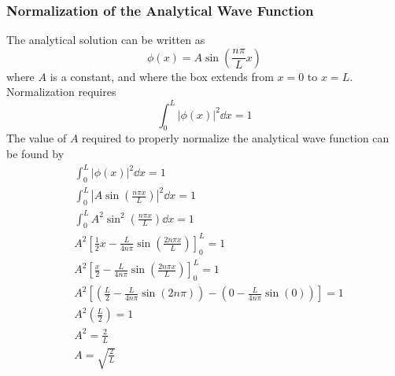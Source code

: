 \documentclass[a4paper, 10pt]{article}
\begin{document}
\subsubsection{Normalization of the Analytical Wave Function}
\noindent The analytical solution can be written as
\begin{equation}
    \phi(x) = A \sin \left( \frac{n \pi}{L} x \right)
\end{equation}
where $A$ is a constant, and where the box extends from $x = 0$ to $x = L$. Normalization requires
\begin{equation} \label{eq:1b_analytical_sol}
    \int_{0}^{L} |\phi(x)|^2 \dd{x} = 1
\end{equation}
The value of $A$ required to properly normalize the analytical wave function can be found by
\begin{align*}
    &\int^L_0 |\phi(x)|^2\dd{x} = 1 \\
    &\int^{L}_{0} \left| A \sin \left( \frac{n \pi x}{L} \right) \right|^2 \dd{x} = 1 \\
    &\int^{L}_{0} A^2 \sin^2 \left( \frac{n \pi x}{L} \right) \dd{x} = 1 \\
    &A^2 \left[ \frac{1}{2}x - \frac{L}{4 n \pi}\sin \left( \frac{2n \pi x}{L} \right) \right]^L_0 = 1 \\
    &A^2 \left[ \frac{x}{2} - \frac{L}{4n \pi}\sin \left( \frac{2n \pi x}{L} \right) \right]^L_0 = 1 \\
    &A^2 \left[ \left( \frac{L}{2} - \frac{L}{4n \pi}\sin(2n\pi) \right) - \left( 0 - \frac{L}{4n \pi}\sin(0) \right) \right] = 1 \\
    &A^2 \left( \frac{L}{2} \right) = 1 \\
    &A^2 = \frac{2}{L} \\
    &\boxed{ A = \sqrt{\frac{2}{L}} }
\end{align*}

\end{document}
